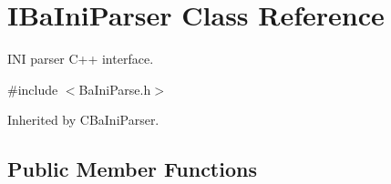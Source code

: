 \hypertarget{classIBaIniParser}{}\section{I\+Ba\+Ini\+Parser Class Reference}
\label{classIBaIniParser}


I\+NI parser C++ interface.  




{\ttfamily \#include $<$Ba\+Ini\+Parse.\+h$>$}



Inherited by C\+Ba\+Ini\+Parser.

\subsection*{Public Member Functions}
